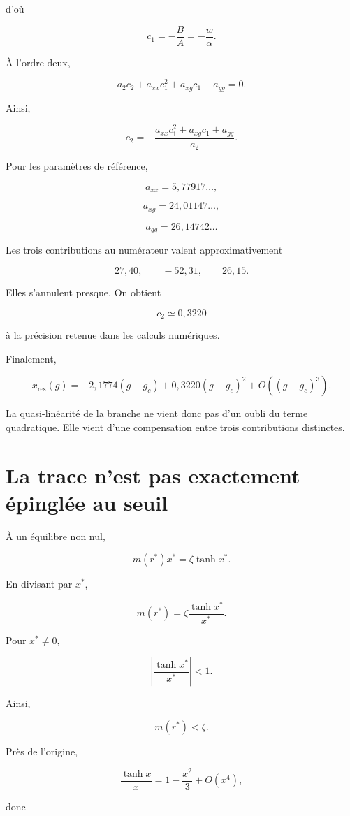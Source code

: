 d'où

\[
c_1=-\frac{B}{A}=-\frac{w}{\alpha}.
\]

À l'ordre deux,

\[
a_2c_2
+
a_{xx}c_1^2
+
a_{xg}c_1
+
a_{gg}
=
0.
\]

Ainsi,

\[
\boxed{
c_2
=
-
\frac{
a_{xx}c_1^2
+
a_{xg}c_1
+
a_{gg}
}{
a_2
}.
}
\]

Pour les paramètres de référence,

\[
a_{xx}
=
5{,}77917\ldots,
\]

\[
a_{xg}
=
24{,}01147\ldots,
\]

\[
a_{gg}
=
26{,}14742\ldots
\]

Les trois contributions au numérateur valent approximativement

\[
27{,}40,
\qquad
-52{,}31,
\qquad
26{,}15.
\]

Elles s'annulent presque. On obtient

\[
c_2
\simeq
0{,}3220
\]

à la précision retenue dans les calculs numériques.

Finalement,

\[
\boxed{
x_{\mathrm{res}}(g)
=
-2{,}1774(g-g_c)
+
0{,}3220(g-g_c)^2
+
O\left(
(g-g_c)^3
\right).
}
\]

La quasi-linéarité de la branche ne vient donc pas d'un oubli du terme
quadratique. Elle vient d'une compensation entre trois contributions
distinctes.

\section{La trace n'est pas exactement épinglée au seuil}
\label{annexe-resistance-marginalite}

À un équilibre non nul,

\[
m(r^\ast)x^\ast
=
\zeta\tanh x^\ast.
\]

En divisant par \(x^\ast\),

\[
\boxed{
m(r^\ast)
=
\zeta\frac{\tanh x^\ast}{x^\ast}.
}
\]

Pour \(x^\ast\neq0\),

\[
\left|
\frac{\tanh x^\ast}{x^\ast}
\right|
<1.
\]

Ainsi,

\[
m(r^\ast)<\zeta.
\]

Près de l'origine,

\[
\frac{\tanh x}{x}
=
1-\frac{x^2}{3}+O(x^4),
\]

donc

